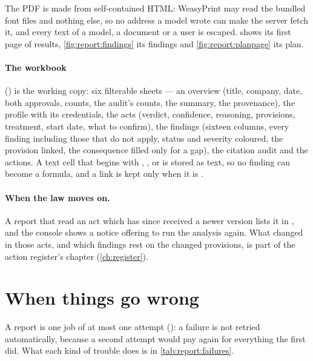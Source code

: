 The PDF is made from self-contained HTML: WeasyPrint may read the bundled font files and
nothing else, so no address a model wrote can make the server fetch it, and every text of a
model, a document or a user is escaped.  shows its first page of
results, \cref{fig:report:findings} its findings and \cref{fig:report:planpage} its plan.

\paragraph{The workbook} () is the working copy: six filterable sheets ---
an overview (title, company, date, both approvals, counts, the audit's counts, the summary, the
provenance), the profile with its credentials, the acts (verdict, confidence, reasoning,
provisions, treatment, start date, what to confirm), the findings (sixteen columns, every finding
including those that do not apply, status and severity coloured, the provision linked, the
consequence filled only for a gap), the
citation audit and the actions. A text cell that begins with \code{=}, \code{+}, \code{-} or
 is stored as text, so no finding can become a formula, and a link is kept only when it
is .

\paragraph{When the law moves on.} A report that read an act which has since received a newer
version lists it in , and the console shows a notice offering to run the
analysis again. What changed in those acts, and which findings rest on the changed provisions,
is part of the action register's chapter (\cref{ch:register}).


\section{When things go wrong}\label{sec:report:failures}

A report is one job of at most one attempt (): a failure is not retried
automatically, because a second attempt would pay again for everything the first did. What
each kind of trouble does is in \cref{tab:report:failures}.

